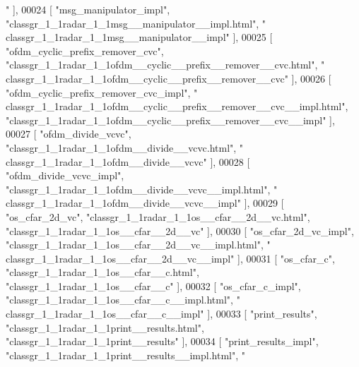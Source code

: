 \begin{DoxyCode}
{      "} ],
00024     [ \textcolor{stringliteral}{"msg\_manipulator\_impl"}, \textcolor{stringliteral}{"classgr\_1\_1radar\_1\_1msg\_\_manipulator\_\_impl.html"}, \textcolor{stringliteral}{"
      classgr\_1\_1radar\_1\_1msg\_\_manipulator\_\_impl"} ],
00025     [ \textcolor{stringliteral}{"ofdm\_cyclic\_prefix\_remover\_cvc"}, \textcolor{stringliteral}{"classgr\_1\_1radar\_1\_1ofdm\_\_cyclic\_\_prefix\_\_remover\_\_cvc.html"}, \textcolor{stringliteral}{"
      classgr\_1\_1radar\_1\_1ofdm\_\_cyclic\_\_prefix\_\_remover\_\_cvc"} ],
00026     [ \textcolor{stringliteral}{"ofdm\_cyclic\_prefix\_remover\_cvc\_impl"}, \textcolor{stringliteral}{"
      classgr\_1\_1radar\_1\_1ofdm\_\_cyclic\_\_prefix\_\_remover\_\_cvc\_\_impl.html"}, \textcolor{stringliteral}{"classgr\_1\_1radar\_1\_1ofdm\_\_cyclic\_\_prefix\_\_remover\_\_cvc\_\_impl"} ],
00027     [ \textcolor{stringliteral}{"ofdm\_divide\_vcvc"}, \textcolor{stringliteral}{"classgr\_1\_1radar\_1\_1ofdm\_\_divide\_\_vcvc.html"}, \textcolor{stringliteral}{"
      classgr\_1\_1radar\_1\_1ofdm\_\_divide\_\_vcvc"} ],
00028     [ \textcolor{stringliteral}{"ofdm\_divide\_vcvc\_impl"}, \textcolor{stringliteral}{"classgr\_1\_1radar\_1\_1ofdm\_\_divide\_\_vcvc\_\_impl.html"}, \textcolor{stringliteral}{"
      classgr\_1\_1radar\_1\_1ofdm\_\_divide\_\_vcvc\_\_impl"} ],
00029     [ \textcolor{stringliteral}{"os\_cfar\_2d\_vc"}, \textcolor{stringliteral}{"classgr\_1\_1radar\_1\_1os\_\_cfar\_\_2d\_\_vc.html"}, \textcolor{stringliteral}{"classgr\_1\_1radar\_1\_1os\_\_cfar\_\_2d\_\_vc"} 
      ],
00030     [ \textcolor{stringliteral}{"os\_cfar\_2d\_vc\_impl"}, \textcolor{stringliteral}{"classgr\_1\_1radar\_1\_1os\_\_cfar\_\_2d\_\_vc\_\_impl.html"}, \textcolor{stringliteral}{"
      classgr\_1\_1radar\_1\_1os\_\_cfar\_\_2d\_\_vc\_\_impl"} ],
00031     [ \textcolor{stringliteral}{"os\_cfar\_c"}, \textcolor{stringliteral}{"classgr\_1\_1radar\_1\_1os\_\_cfar\_\_c.html"}, \textcolor{stringliteral}{"classgr\_1\_1radar\_1\_1os\_\_cfar\_\_c"} ],
00032     [ \textcolor{stringliteral}{"os\_cfar\_c\_impl"}, \textcolor{stringliteral}{"classgr\_1\_1radar\_1\_1os\_\_cfar\_\_c\_\_impl.html"}, \textcolor{stringliteral}{"
      classgr\_1\_1radar\_1\_1os\_\_cfar\_\_c\_\_impl"} ],
00033     [ \textcolor{stringliteral}{"print\_results"}, \textcolor{stringliteral}{"classgr\_1\_1radar\_1\_1print\_\_results.html"}, \textcolor{stringliteral}{"classgr\_1\_1radar\_1\_1print\_\_results"} ],
00034     [ \textcolor{stringliteral}{"print\_results\_impl"}, \textcolor{stringliteral}{"classgr\_1\_1radar\_1\_1print\_\_results\_\_impl.html"}, \textcolor{stringliteral}{"
}
\end{DoxyCode}
